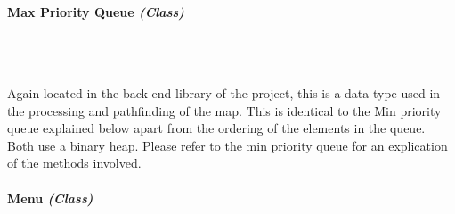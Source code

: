 \begin{FlushLeft}
\paragraph{Max Priority Queue \textit{(Class)}} \mbox{} \\

    \begin{figure}[H]
        \centering
    \end{figure}\\
    
    Again located in the back end library of the project, this is a data type used in the processing and pathfinding of the map. This is identical to the Min priority queue explained below apart from the ordering of the elements in the queue. Both use a binary heap. Please refer to the min priority queue for an explication of the methods involved.


    \bk

    \pagebreak
\paragraph{Menu \textit{(Class)}} \mbox{} \\


\end{FlushLeft}
